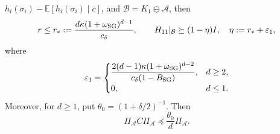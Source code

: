 \begin{lemma}
$h_i(\sigma_i)-\mathbb E[h_i(\sigma_i)\mid c]$, and
$\mathcal B=K_1\ominus\mathcal A$, then
\[
 r\le r_*:=\frac{d\kappa(1+\omega_{\rm SG})^{d-1}}{c_\delta},\qquad
 H_{11}|_{\mathcal B}\succeq(1-\eta)I,
\quad \eta:=r_*+\varepsilon_1,
\]
where
\begin{equation}\label{eq:sg-singleton-complement}
 \varepsilon_1=
 \begin{cases}
 \dfrac{2(d-1)\kappa(1+\omega_{\rm SG})^{d-2}}
       {c_\delta(1-B_{\rm SG})},&d\ge2,\\[3pt]
 0,&d\le1.
 \end{cases}
\end{equation}
Moreover, for $d\ge1$, put $\theta_0=(1+\delta/2)^{-1}$.  Then
\begin{equation}\label{eq:sg-additive-compression}
 \Pi_{\mathcal A}C\Pi_{\mathcal A}\preceq \frac{\theta_0}{d}\Pi_{\mathcal A}.
\end{equation}
\end{lemma}

